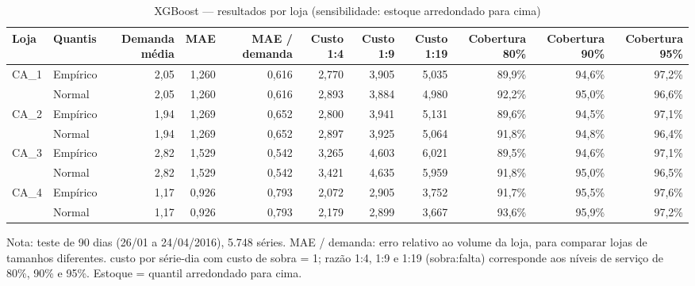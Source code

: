 \begin{table}[htbp]
\centering
\small
\caption{XGBoost — resultados por loja (sensibilidade: estoque arredondado para cima)}
\label{tab:xgb_por_loja_sensibilidade}
\begin{tabular}{llrrrrrrrrr}
\toprule
Loja & Quantis & Demanda média & MAE & MAE / demanda & Custo 1:4 & Custo 1:9 & Custo 1:19 & Cobertura 80\% & Cobertura 90\% & Cobertura 95\% \\
\midrule
CA\_1 & Empírico & 2,05 & 1,260 & 0,616 & 2,770 & 3,905 & 5,035 & 89,9\% & 94,6\% & 97,2\% \\
 & Normal & 2,05 & 1,260 & 0,616 & 2,893 & 3,884 & 4,980 & 92,2\% & 95,0\% & 96,6\% \\
\addlinespace
CA\_2 & Empírico & 1,94 & 1,269 & 0,652 & 2,800 & 3,941 & 5,131 & 89,6\% & 94,5\% & 97,1\% \\
 & Normal & 1,94 & 1,269 & 0,652 & 2,897 & 3,925 & 5,064 & 91,8\% & 94,8\% & 96,4\% \\
\addlinespace
CA\_3 & Empírico & 2,82 & 1,529 & 0,542 & 3,265 & 4,603 & 6,021 & 89,5\% & 94,6\% & 97,1\% \\
 & Normal & 2,82 & 1,529 & 0,542 & 3,421 & 4,635 & 5,959 & 91,8\% & 95,0\% & 96,5\% \\
\addlinespace
CA\_4 & Empírico & 1,17 & 0,926 & 0,793 & 2,072 & 2,905 & 3,752 & 91,7\% & 95,5\% & 97,6\% \\
 & Normal & 1,17 & 0,926 & 0,793 & 2,179 & 2,899 & 3,667 & 93,6\% & 95,9\% & 97,2\% \\
\bottomrule
\end{tabular}
\par\smallskip
{\footnotesize Nota: teste de 90 dias (26/01 a 24/04/2016), 5.748 séries. MAE / demanda: erro relativo ao volume da loja, para comparar lojas de tamanhos diferentes. custo por série-dia com custo de sobra = 1; razão 1:4, 1:9 e 1:19 (sobra:falta) corresponde aos níveis de serviço de 80\%, 90\% e 95\%. Estoque = quantil arredondado para cima.}
\end{table}
